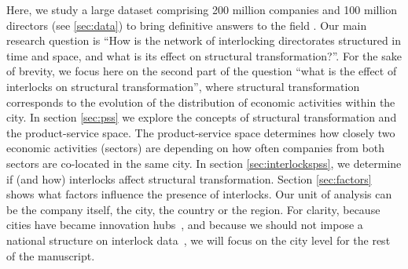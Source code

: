 

Here, we study a large dataset comprising 200 million companies and 100 million directors (see \ref{sec:data}) to bring definitive answers to the field .
Our main research question is ``How is the network of interlocking directorates structured in time and space, and what is its effect on structural transformation?''.
For the sake of brevity, we focus here on the second part of the question ``what is the effect of interlocks on structural transformation'',
where structural transformation corresponds to the evolution of the distribution of economic activities within the city.
In section \ref{sec:pss} we explore the concepts of structural transformation and the product-service space.
The product-service space determines how closely two economic activities (sectors) are depending on how often companies from both sectors are co-located in the same city.
In section \ref{sec:interlockspss}, we determine if (and how) interlocks affect structural transformation.
Section \ref{sec:factors} shows what factors influence the presence of interlocks.
Our unit of analysis can be the company itself, the city, the country or the region. 
For clarity, 
because cities have became innovation hubs~\citep{Belderbos2014}, 
and because we should not impose a national structure on interlock data~\citep{Heemskerk2016},
we will focus on the city level for the rest of the manuscript.


